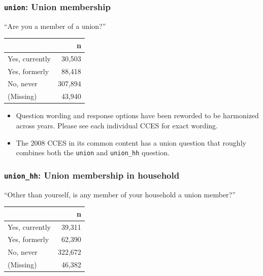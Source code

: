 \documentclass[10pt,article,oneside]{memoir}
\theoremstyle{definition}
\begin{document}
\hypertarget{union-union-membership}{%
\subsubsection{\texorpdfstring{\texttt{union}: Union
membership}{union: Union membership}}\label{union-union-membership}}

``Are you a member of a union?''

\begin{table}[H]
\centering
\begin{tabular}{lr}
\toprule
 & n\\
\midrule
Yes, currently & 30,503\\
Yes, formerly & 88,418\\
No, never & 307,894\\
(Missing) & 43,940\\
\bottomrule
\end{tabular}
\end{table}

\begin{itemize}
\tightlist
\item
  Question wording and response options have been reworded to be
  harmonized across years. Please see each individual CCES for exact
  wording.
\item
  The 2008 CCES in its common content has a union question that roughly
  combines both the \texttt{union} and \texttt{union\_hh} question.
\end{itemize}

\hypertarget{union_hh-union-membership-in-household}{%
\subsubsection{\texorpdfstring{\texttt{union\_hh}: Union membership in
household}{union\_hh: Union membership in household}}\label{union_hh-union-membership-in-household}}

``Other than yourself, is any member of your household a union member?''

\begin{table}[H]
\centering
\begin{tabular}{lr}
\toprule
 & n\\
\midrule
Yes, currently & 39,311\\
Yes, formerly & 62,390\\
No, never & 322,672\\
(Missing) & 46,382\\
\bottomrule
\end{tabular}
\end{table}
\end{document}
